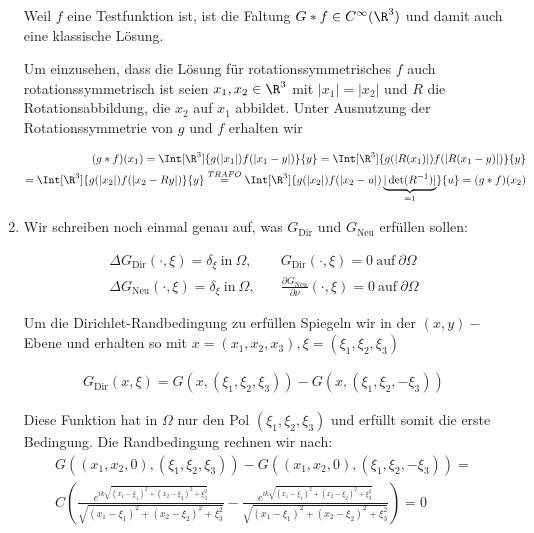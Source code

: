 \begin{solution}
\begin{enumerate}[label = (\roman*)]
Weil $f$ eine Testfunktion ist, ist die Faltung $G \ast f \in C^{\infty}(\R^3)$ und damit auch eine klassische Lösung.

Um einzusehen, dass die Lösung für rotationssymmetrisches $f$ auch rotationssymmetrisch ist seien $x_1, x_2 \in \R^3$ mit
$|x_1| = |x_2|$ und $R$ die Rotationsabbildung, die $x_2$ auf $x_1$ abbildet.
Unter Ausnutzung der Rotationssymmetrie von $g$ und $f$ erhalten wir

\begin{align*}
  (g \ast f)(x_1)
  =
  \Int[\R^3]{g(|x_1|) f(|x_1 - y|)}{y}
  = \Int[\R^3]{g(|R(x_1)|) f(|R(x_1 - y)|)}{y} \\
  =
  \Int[\R^3]{g(|x_2|) f(|x_2 - Ry|) }{y}
  \stackrel{TRAFO}{=} \Int[\R^3]{g(|x_2|) f(|x_2 - u|) \underbrace{|\det(R^{-1})|}_{=1}}{u} =
  (g \ast f)(x_2)
\end{align*}

\item Wir schreiben noch einmal genau auf, was $G_{\mathrm{Dir}}$ und $G_{\mathrm{Neu}}$ erfüllen sollen:

\begin{align*}
  \Delta G_\mathrm{Dir}(\cdot, \xi) = \delta_\xi ~\text{in}~ \Omega,&
  \quad
  G_\mathrm{Dir}(\cdot, \xi) = 0 ~\text{auf}~ \partial \Omega \\
  \Delta G_\mathrm{Neu}(\cdot, \xi) = \delta_\xi ~\text{in}~ \Omega,&
  \quad
  \frac{\partial G_\mathrm{Neu}}{\partial \nu}(\cdot, \xi) = 0 ~\text{auf}~ \partial \Omega
\end{align*}

Um die Dirichlet-Randbedingung zu erfüllen Spiegeln wir in der $(x,y)-$Ebene und erhalten so mit $x = (x_1,x_2,x_3), \xi = (\xi_1, \xi_2, \xi_3)$

\begin{align*}
  G_\mathrm{Dir}(x,\xi) = G(x,(\xi_1, \xi_2, \xi_3)) - G(x,(\xi_1,\xi_2, -\xi_3))
\end{align*}

Diese Funktion hat in $\Omega$ nur den Pol $(\xi_1, \xi_2, \xi_3)$ und erfüllt somit die erste Bedingung. Die Randbedingung rechnen wir nach:
\begin{align*}
  G((x_1,x_2,0),(\xi_1, \xi_2, \xi_3)) - G((x_1,x_2,0),(\xi_1,\xi_2, -\xi_3))
  = \\
  C(\frac{e^{ik\sqrt{(x_1 - \xi_1)^2 + (x_2 - \xi_2)^2 + \xi_3^2 }}}{\sqrt{(x_1 - \xi_1)^2 + (x_2 - \xi_2)^2 + \xi_3^2 }}
    -\frac{e^{ik\sqrt{(x_1 - \xi_1)^2 + (x_2 - \xi_2)^2 + \xi_3^2 }}}{\sqrt{(x_1 - \xi_1)^2 + (x_2 - \xi_2)^2 + \xi_3^2 }})
  =
  0
\end{align*}


\end{enumerate}
\end{solution}
